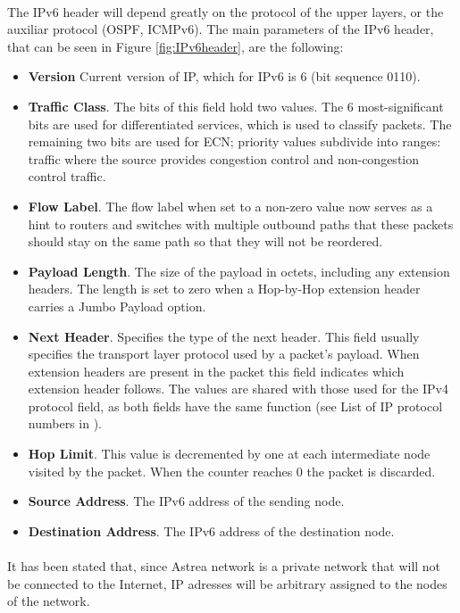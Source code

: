 \documentclass[12pt,a4paper]{report}
\begin{document}
\paragraph{}The IPv6 header will depend greatly on the protocol of the upper layers, or the auxiliar protocol (OSPF, ICMPv6). The main parameters of the IPv6 header, that can be seen in Figure \ref{fig:IPv6header}, are the following:
\begin{itemize}
\item \textbf{Version} Current version of IP, which for IPv6 is 6 (bit sequence 0110).
\item \textbf{Traffic Class}. The bits of this field hold two values. The 6 most-significant bits are used for differentiated services, which is used to classify packets. The remaining two bits are used for ECN; priority values subdivide into ranges: traffic where the source provides congestion control and non-congestion control traffic.
\item \textbf{Flow Label}. The flow label when set to a non-zero value now serves as a hint to routers and switches with multiple outbound paths that these packets should stay on the same path so that they will not be reordered.
\item \textbf{Payload Length}. The size of the payload in octets, including any extension headers. The length is set to zero when a Hop-by-Hop extension header carries a Jumbo Payload option.
\item \textbf{Next Header}. Specifies the type of the next header. This field usually specifies the transport layer protocol used by a packet's payload. When extension headers are present in the packet this field indicates which extension header follows. The values are shared with those used for the IPv4 protocol field, as both fields have the same function (see List of IP protocol numbers in \cite{IANAPN}).
\item \textbf{Hop Limit}. This value is decremented by one at each intermediate node visited by the packet. When the counter reaches 0 the packet is discarded.
\item \textbf{Source Address}. The IPv6 address of the sending node.
\item \textbf{Destination Address}. The IPv6 address of the destination node.
\end{itemize}
\paragraph{}It has been stated that, since Astrea network is a private network that will not be connected to the Internet, IP adresses will be arbitrary assigned to the nodes of the network.
\end{document}
